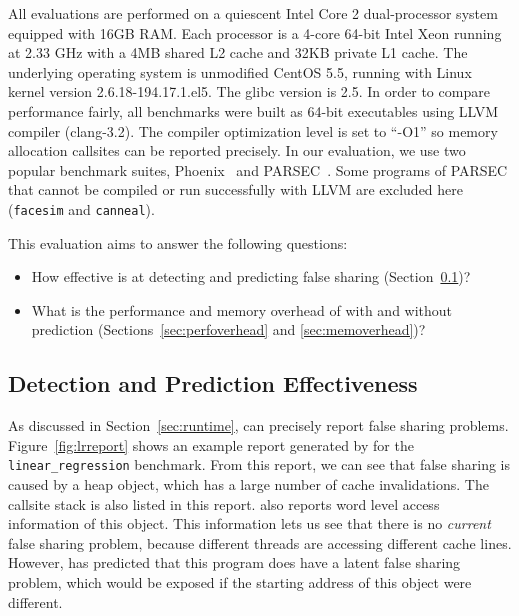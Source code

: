 \label{sec:evaluation}

All evaluations are performed on a quiescent Intel Core 2 dual-processor system equipped with 
16GB RAM. 
Each processor is a 4-core 64-bit Intel Xeon running at 2.33 GHz with a 4MB
shared L2 cache and 32KB private L1 cache. 
The underlying operating system is unmodified CentOS 5.5, running with Linux kernel
version 2.6.18-194.17.1.el5. The glibc version is 2.5. 
In order to compare performance fairly, all benchmarks were built as 64-bit executables 
using LLVM compiler (clang-3.2). The compiler optimization level is set to ``-O1'' 
so memory allocation callsites can be reported precisely.
In our evaluation, we use two popular benchmark suites,
Phoenix~\cite{phoenix-hpca} and PARSEC~\cite{parsec}.  Some programs
of PARSEC that cannot be compiled or run successfully with LLVM are
excluded here (\texttt{facesim} and \texttt{canneal}).

This evaluation aims to answer the following questions:
\begin{itemize}
\item
  How effective is \Predator{} at detecting and predicting false sharing (Section~\ref{sec:effective})?

\item
  What is the performance and memory overhead of \Predator{} with and without prediction
  (Sections~\ref{sec:perfoverhead} and \ref{sec:memoverhead})?

\end{itemize}

\subsection{Detection and Prediction Effectiveness}
\label{sec:effective}

As discussed in Section~\ref{sec:runtime}, \Predator{} can precisely report  
false sharing problems. 
Figure~\ref{fig:lrreport} shows an example report generated by \Predator{} for the \texttt{linear\_regression} 
benchmark. From this report, we can see that false sharing is caused by a heap object, which
has a large number of cache invalidations. 
The callsite stack is also listed in this report. \Predator{} also reports word level access information
of this object. This information lets us see that there is no \emph{current} false sharing problem, because different threads are accessing different cache lines. However, \Predator{} has predicted that this program does 
have a latent false sharing problem, which would be exposed if the starting address of this object were different. 

